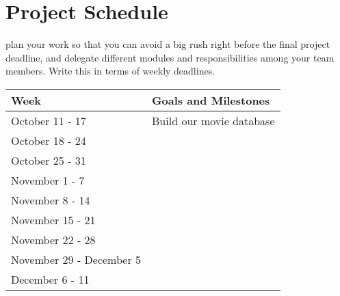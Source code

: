 \documentclass[12pt]{article}
\begin{document}
 \section{Project Schedule}
plan your work so that you can avoid a big rush right before the final project deadline, and delegate different modules and responsibilities among your team members. Write this in terms of weekly deadlines.
\begin{center}
\begin{tabular}{l l}
\hline
\textbf{Week} & \textbf{Goals and Milestones}\\
\hline
October 11 - 17				&	 Build our movie database\\
October 18 - 24				&	\\
October 25 - 31				&	\\
November 1 - 7				&	\\
November 8 - 14 			&	\\
November 15 - 21			&	\\
November 22 - 28			&	\\
November 29 - December 5	&	\\
December 6 - 11 			&   \\
\end{tabular}
\end{center}
\end{document}
